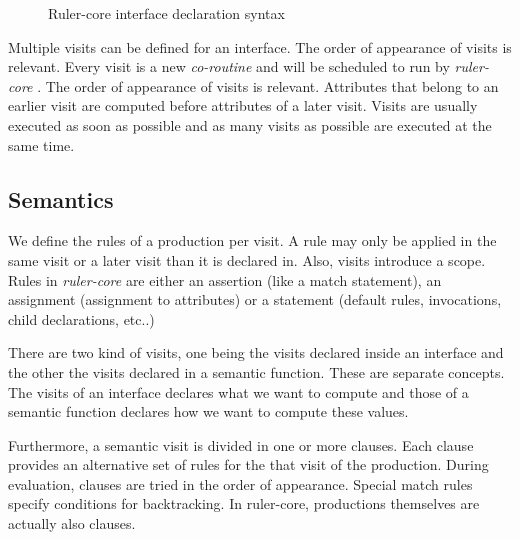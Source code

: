 \documentclass[twoside, titlepage, openright, a4paper]{book}
\newcommand{\Varid}[1]{\mathit{#1}}
\def\resethooks{%
  \global\let\SaveRestoreHook\empty
  \global\let\ColumnHook\empty}
\newcommand{\hsindent}[1]{\quad}%
\let\hspre\empty
\let\hspost\empty
\newcommand{\rcore}{\emph{ruler-core }}
\begin{document}
\begin{figure}[h!]
\resethooks
\caption{Ruler-core interface declaration syntax}
\label{itf:syntax}
\end{figure}

Multiple visits can be defined for an interface. The order of appearance of visits is relevant. Every visit is a new \emph{co-routine} and will be scheduled to run by \rcore. The order of appearance of visits is relevant. Attributes that belong to an earlier visit are computed before attributes of a later visit. Visits are usually executed as soon as possible and as many visits as possible are executed at the same time. %

\subsection{Semantics}
We define the rules of a production per visit. A rule may only be applied in the same visit or a later visit than it is declared in. Also, visits introduce a scope.
Rules in \rcore are either an assertion (like a match statement), an assignment (assignment to attributes) or a statement (default rules, invocations, child declarations, etc..)

There are two kind of visits, one being the visits declared inside an interface and the other the visits declared in a semantic function. These are separate concepts. The visits of an interface declares what we want to compute and those of a semantic function declares how we want to compute these values.

Furthermore, a semantic visit is divided in one or more clauses. Each clause provides an alternative set of rules for the that visit of the production. During evaluation, clauses are tried in the order of appearance. Special match rules specify conditions for backtracking.
In ruler-core, productions themselves are actually also clauses.
\end{document}
